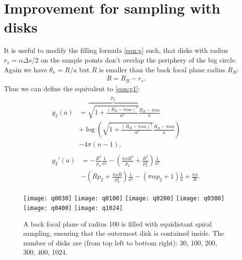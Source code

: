 \documentclass[twocolumn,DIV18]{scrartcl}
\renewcommand{\(}{\left(}
\renewcommand{\)}{\right)}
\begin{document}
\section{Improvement for sampling with disks}
It is useful to modify the filling formula \eqref{eqn:g} such, that
disks with radius $r_s=\alpha\Delta s/2$ on the sample points don't
overlap the periphery of the big circle. Again we have $\theta_n=R/a$ but $R$ is smaller than the back focal plane radius $R_B$:
\begin{align}
  R=R_B-r_s.
\end{align}
Thus we can define the equivalent to \eqref{eqn:g1}:
\begin{align}
  \begin{split}
  g_2(a)&=\overbrace{\sqrt{1+\frac{(R_B-\pi\alpha a)^2}{a^2}}}^{p_2}
  \frac{R_B-\pi\alpha a}{a}\\
  &+
  \log\(\sqrt{1+\frac{(R_B-\pi\alpha a)^2}{a^2}}\frac{R_B-\pi\alpha a}{a}\)\\ 
  &-4\pi (n-1),\end{split}\\
  \begin{split}
  g_2'(a)&=
  -\frac{R^3}{p_2}\frac{1}{a^4}
  -\(\frac{\pi\alpha R^2}{p_2}+\frac{R^2}{p_2^2}\)\frac{1}{a^3}\\
  &-\(R p_2+\frac{\pi\alpha R}{p_2^2}\)\frac{1}{a^2}-\(\pi\alpha p_2+1\)\frac{1}{a}+\frac{\pi\alpha}{R}.\end{split}
\end{align}


\begin{figure}[h]
  \begin{center}
    \texttt{[image: q0030]}
    \texttt{[image: q0100]}
    \texttt{[image: q0200]}
    \texttt{[image: q0300]}
    \texttt{[image: q0400]}
    \texttt{[image: q1024]}
  \end{center}
  \caption{A back focal plane of radius 100 is filled with equidistant
    spiral sampling, ensuring that the outermost disk is contained
    inside. The number of disks are (from top left to bottom right):
    30, 100, 200, 300, 400, 1024.}
\end{figure}
\end{document}
